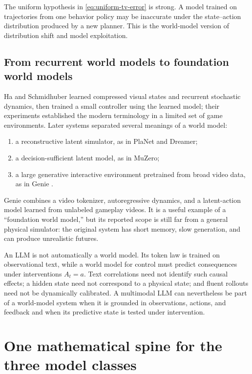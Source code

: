 \documentclass[11pt]{amsart}
\numberwithin{equation}{section}
\theoremstyle{definition}
\theoremstyle{plain}
\theoremstyle{remark}
\begin{document}
The uniform hypothesis in \eqref{eq:uniform-tv-error} is strong.  A model
trained on trajectories from one behavior policy may be inaccurate under the
state--action distribution produced by a new planner.  This is the world-model
version of distribution shift and model exploitation.

\subsection{From recurrent world models to foundation world models}

Ha and Schmidhuber \cite{HaSchmidhuber2018} learned compressed visual states
and recurrent stochastic dynamics, then trained a small controller using the
learned model; their experiments established the modern terminology in a
limited set of game environments.  Later systems separated several meanings
of a world model:
\begin{enumerate}[label=(\arabic*)]
\item a reconstructive latent simulator, as in PlaNet and Dreamer;
\item a decision-sufficient latent model, as in MuZero;
\item a large generative interactive environment pretrained from broad video
data, as in Genie \cite{BruceEtAl2024Genie}.
\end{enumerate}
Genie combines a video tokenizer, autoregressive dynamics, and a latent-action
model learned from unlabeled gameplay videos.  It is a useful example of a
``foundation world model,'' but its reported scope is still far from a general
physical simulator: the original system has short memory, slow generation,
and can produce unrealistic futures.

An LLM is not automatically a world model.  Its token law is trained on
observational text, while a world model for control must predict consequences
under interventions $A_t=a$.  Text correlations need not identify such causal
effects; a hidden state need not correspond to a physical state; and fluent
rollouts need not be dynamically calibrated.  A multimodal LLM can nevertheless
be part of a world-model system when it is grounded in observations, actions,
and feedback and when its predictive state is tested under intervention.


\section{One mathematical spine for the three model classes}
\label{sec:unification}
\end{document}
